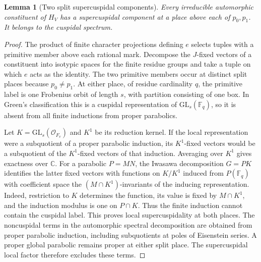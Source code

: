 \documentclass[a4paper,11pt]{article}
\newtheorem{lemma}[proposition]{Lemma}
\theoremstyle{definition}
\theoremstyle{remark}
\numberwithin{equation}{section}
\begin{document}
\begin{lemma}[Two split supercuspidal components]
\leavevmode\label{lem:twoelliptic806}
Every irreducible automorphic constituent of \(H_V\) has a
supercuspidal component at a place above each of \(p_0,p_1\).
It belongs to the cuspidal spectrum.
\end{lemma}
\begin{proof}
The product of finite character projections defining \(e\) selects
tuples with a primitive member above each rational mark. Decompose
the \(J\)-fixed vectors of a constituent into isotypic spaces
for the finite residue groups and take a tuple on which \(e\)
acts as the identity. The two primitive members occur at distinct
split places because \(p_0\ne p_1\). At either place, of residue
cardinality \(q\), the primitive label is one Frobenius orbit of
length \(s\), with partition consisting of one box. In Green's
classification this is a cuspidal representation of
\(\mathrm{GL}_s(\mathbb F_q)\), so it is absent from all finite
inductions from proper parabolics.

Let \(K=\mathrm{GL}_s(\mathcal O_{F_v})\) and \(K^1\) be its
reduction kernel. If the local representation were a subquotient
of a proper parabolic induction, its \(K^1\)-fixed vectors would
be a subquotient of the \(K^1\)-fixed vectors of that induction.
Averaging over \(K^1\) gives exactness over \(\mathbb C\).
For a parabolic \(P=MN\), the Iwasawa decomposition \(G=PK\)
identifies the latter fixed vectors with functions on \(K/K^1\)
induced from \(P(\mathbb F_q)\) with coefficient space the
\((M\cap K^1)\)-invariants of the inducing representation.
Indeed, restriction to \(K\) determines the function, its value
is fixed by \(M\cap K^1\), and the induction modulus is one on
\(P\cap K\). Thus the finite induction cannot contain the
cuspidal label. This proves local supercuspidality at both
places. The noncuspidal terms in the automorphic spectral
decomposition are obtained from proper parabolic induction,
including subquotients at poles of Eisenstein series. A proper
global parabolic remains proper at either split place. The
supercuspidal local factor therefore excludes these terms.
\end{proof}
\end{document}
